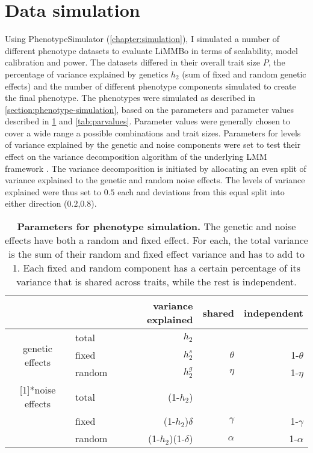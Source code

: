\section{Data simulation}
\label{section:data-limmbo}
Using PhenotypeSimulator (\cref{chapter:simulation}), I simulated a number of different phenotype datasets to evaluate LiMMBo in terms of scalability, model calibration and power. The datasets differed in their overall trait size \(P\), the percentage of variance explained by genetics \(h_2\) (sum of fixed and random genetic effects) and the number of different phenotype components simulated to create the final phenotype. The phenotypes were simulated as described in \cref{section:phenotype-simulation}, based on the parameters and parameter values described in \cref{tab:pardescription} and \cref{tab:parvalues}. Parameter values were generally chosen to cover a wide range a possible combinations and trait sizes. Parameters for levels of variance explained by the genetic and noise components were set to test their effect on the variance decomposition algorithm of the underlying LMM framework \citep{Casale2015}. The variance decomposition is initiated by allocating an even split of variance explained to the genetic and random noise effects. The levels of variance explained were thus set to \(0.5\) each and deviations from this equal split into either direction (\(0.2\),\(0.8\)). 

\begin{table}[htbp]
  \centering
  \caption[\textbf{Parameters for phenotype simulation.}]{\textbf{Parameters for phenotype simulation.} The genetic and noise effects have both a random and fixed effect. For each, the total variance is the sum of their random and fixed effect variance and has to add to 1. Each fixed and random component has a certain percentage of its variance that is shared across traits, while the rest is independent.}
    \begin{tabular}{clrrr}
    \toprule
          &       & variance explained & shared & independent \\
    \midrule
    \multirow{3}[1]{*}{genetic effects} & total & \(h_2\) &       &  \\
          & fixed & \(h_2^s\) & \(\theta\) & 1-\(\theta\) \\
          & random & \(h_2^g\) & \(\eta\) & 1-\(\eta\) \\
   \addlinespace[1.5ex]
    \multirow{3}[1]{*}{noise effects} & total & (1-\(h_2\)) &       &  \\
          & fixed & (1-\(h_2\))\(\delta\) & \(\gamma\) & 1-\(\gamma\) \\
          & random & (1-\(h_2\))(1-\(\delta\)) & \(\alpha\) & 1-\(\alpha\) \\
    \bottomrule
    \end{tabular}%
  \label{tab:pardescription}%
\end{table}%

